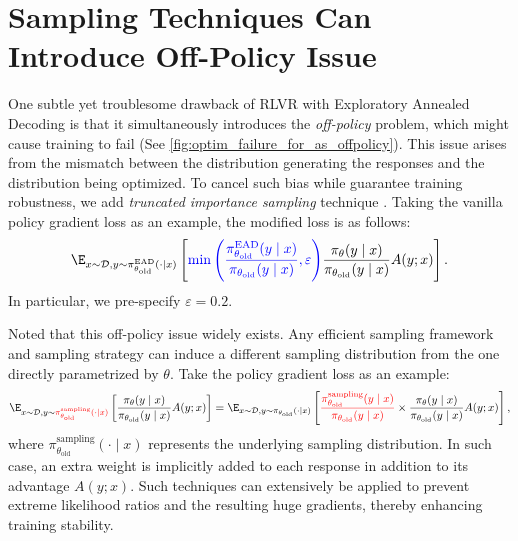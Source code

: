 \documentclass{article} %
\newcommand{\algname}{Exploratory Annealed Decoding\xspace}
\begin{document}
\section{Sampling Techniques Can Introduce Off-Policy Issue}
\label{sec:more-tis}
One subtle yet troublesome drawback of RLVR with \algname is that it simultaneously introduces the \emph{off-policy} problem, which might cause training to fail (See \cref{fig:optim_failure_for_as_offpolicy}). This issue arises from the mismatch between the distribution generating the responses and the distribution being optimized. To cancel such bias while guarantee training robustness, we add \emph{truncated importance sampling} technique \citep{heckman1998matching, hilton2022batch,yao2025offpolicy}. Taking the vanilla policy gradient loss as an example, the modified loss is as follows:
\begin{align*}
\E_{x \sim \mathcal{D},y{\sim}{\pi^{\text{EAD}}_{\theta_{\text{old}}}(\cdot\mid x)}}
\left[{\color{blue}\min\left(\frac{\pi^{\text{EAD}}_{\theta_{\text{old}}}(y\mid x)}{\pi_{\theta_{\text{old}}}(y\mid x)},\varepsilon\right)}\frac{\pi_{\theta}(y\mid x)}{\pi_{\theta_{\text{old}}}(y\mid x)}A(y;x)\right].
\end{align*}
In particular, we pre-specify $\varepsilon=0.2$.

Noted that this off-policy issue widely exists. Any efficient sampling framework \citep{yao2025offpolicy} and sampling strategy can induce a different sampling distribution from the one directly parametrized by $\theta$.
Take the policy gradient loss as an example:
\begin{align*}
\E_{x \sim \mathcal{D},y{\sim} \mathbin{\color{red}\pi^{\text{sampling}}_{\theta_{\text{old}}}(\cdot\mid x)}}
\left[\frac{\pi_{\theta}(y\mid x)}{\pi_{\theta_{\text{old}}}(y\mid x)}A(y;x)\right] 
=\E_{x \sim \mathcal{D},y{\sim} \mathbin{\pi_{\theta_{\text{old}}}(\cdot\mid x)}}\left[{\color{red}\frac{\pi^{\text{sampling}}_{\theta_{\text{old}}}(y\mid x)}{\pi_{\theta_{\text{old}}}(y\mid x)}}\times\frac{\pi_{\theta}(y\mid x)}{\pi_{\theta_{\text{old}}}(y\mid x)}A(y;x)\right],
\end{align*}
where $\pi^{\text{sampling}}_{\theta_{\text{old}}}(\cdot\mid x)$ represents the underlying sampling distribution. 
In such case, an extra weight is implicitly added to each response in addition to its advantage $A(y;x)$. 
Such techniques can extensively be applied to prevent extreme likelihood ratios and the resulting huge gradients, thereby enhancing training stability. 
\end{document}
